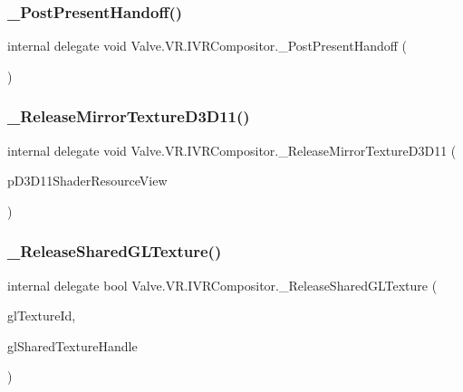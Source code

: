 \subsubsection{\texorpdfstring{\_PostPresentHandoff()}{\_PostPresentHandoff()}}
{\footnotesize\ttfamily internal delegate void Valve.\+V\+R.\+I\+V\+R\+Compositor.\+\_\+\+Post\+Present\+Handoff (\begin{DoxyParamCaption}{ }\end{DoxyParamCaption})}

\mbox{\label{struct_valve_1_1_v_r_1_1_i_v_r_compositor_a79364707bc336637d4790df0a5949c2f}} 
\subsubsection{\texorpdfstring{\_ReleaseMirrorTextureD3D11()}{\_ReleaseMirrorTextureD3D11()}}
{\footnotesize\ttfamily internal delegate void Valve.\+V\+R.\+I\+V\+R\+Compositor.\+\_\+\+Release\+Mirror\+Texture\+D3\+D11 (\begin{DoxyParamCaption}\item[{Int\+Ptr}]{p\+D3\+D11\+Shader\+Resource\+View }\end{DoxyParamCaption})}

\mbox{\label{struct_valve_1_1_v_r_1_1_i_v_r_compositor_a8007bc81c8368208327b657a2d9d70b5}} 
\subsubsection{\texorpdfstring{\_ReleaseSharedGLTexture()}{\_ReleaseSharedGLTexture()}}
{\footnotesize\ttfamily internal delegate bool Valve.\+V\+R.\+I\+V\+R\+Compositor.\+\_\+\+Release\+Shared\+G\+L\+Texture (\begin{DoxyParamCaption}\item[{uint}]{gl\+Texture\+Id,  }\item[{Int\+Ptr}]{gl\+Shared\+Texture\+Handle }\end{DoxyParamCaption})}

